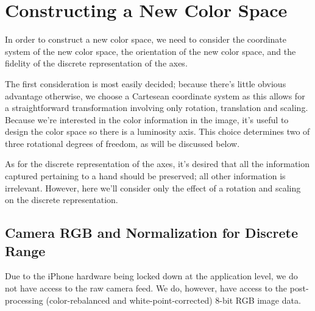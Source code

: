 \ifpdf

    \graphicspath{{Chapter2/Figs/Raster/}{Chapter2/Figs/PDF/}{Chapter2/Figs/}}

\else

    \graphicspath{{Chapter2/Figs/Vector/}{Chapter2/Figs/}}

\fi





\section{Constructing a New Color Space}\label{sec:ConstructingANewColorSpace}



In order to construct a new color space, we need to consider the coordinate system of the new color space, the orientation of the new color space, and the fidelity of the discrete representation of the axes.



The first consideration is most easily decided; because there's little obvious advantage otherwise, we choose a Cartesean coordinate system as this allows for a straightforward transformation involving only rotation, translation and scaling. Because we're interested in the color information in the image, it's useful to design the color space so there is a luminosity axis. This choice determines two of three rotational degrees of freedom, as will be discussed below.



As for the discrete representation of the axes, it's desired that all the information captured pertaining to a hand should be preserved; all other information is irrelevant. However, here we'll consider only the effect of a rotation and scaling on the discrete representation.





\subsection{Camera RGB and Normalization for Discrete Range}\label{sec:CameraRGB}



Due to the iPhone hardware being locked down at the application level, we do not have access to the raw camera feed. We do, however, have access to the post-processing (color-rebalanced and white-point-corrected) 8-bit RGB image data.



